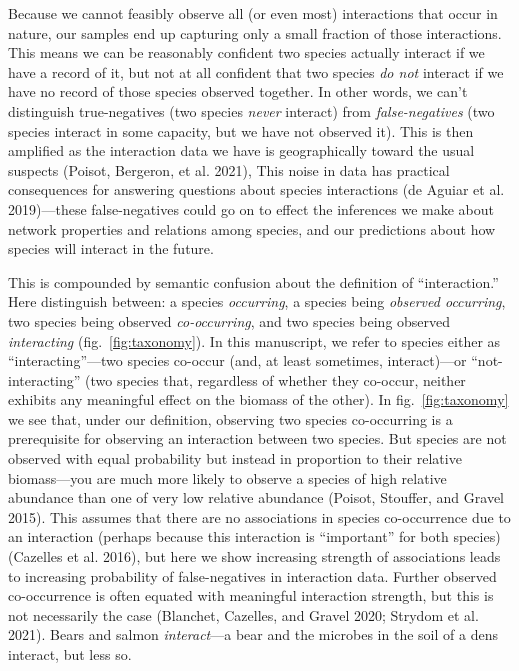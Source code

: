 \documentclass[11pt]{article}
\begin{document}
Because we cannot feasibly observe all (or even most) interactions that
occur in nature, our samples end up capturing only a small fraction of
those interactions. This means we can be reasonably confident two
species actually interact if we have a record of it, but not at all
confident that two species \emph{do not} interact if we have no record
of those species observed together. In other words, we can't distinguish
true-negatives (two species \emph{never} interact) from
\emph{false-negatives} (two species interact in some capacity, but we
have not observed it). This is then amplified as the interaction data we
have is geographically toward the usual suspects (Poisot, Bergeron, et
al. 2021), This noise in data has practical consequences for answering
questions about species interactions (de Aguiar et al. 2019)---these
false-negatives could go on to effect the inferences we make about
network properties and relations among species, and our predictions
about how species will interact in the future.

This is compounded by semantic confusion about the definition of
``interaction.'' Here distinguish between: a species \emph{occurring}, a
species being \emph{observed occurring}, two species being observed
\emph{co-occurring}, and two species being observed \emph{interacting}
(fig.~\ref{fig:taxonomy}). In this manuscript, we refer to species
either as ``interacting''---two species co-occur (and, at least
sometimes, interact)---or ``not-interacting'' (two species that,
regardless of whether they co-occur, neither exhibits any meaningful
effect on the biomass of the other). In fig.~\ref{fig:taxonomy} we see
that, under our definition, observing two species co-occurring is a
prerequisite for observing an interaction between two species. But
species are not observed with equal probability but instead in
proportion to their relative biomass---you are much more likely to
observe a species of high relative abundance than one of very low
relative abundance (Poisot, Stouffer, and Gravel 2015). This assumes
that there are no associations in species co-occurrence due to an
interaction (perhaps because this interaction is ``important'' for both
species) (Cazelles et al. 2016), but here we show increasing strength of
associations leads to increasing probability of false-negatives in
interaction data. Further observed co-occurrence is often equated with
meaningful interaction strength, but this is not necessarily the case
(Blanchet, Cazelles, and Gravel 2020; Strydom et al. 2021). Bears and
salmon \emph{interact}---a bear and the microbes in the soil of a dens
interact, but less so.
\end{document}
